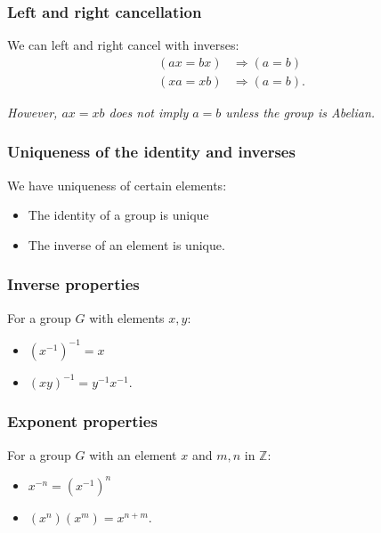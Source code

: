 \documentclass[a4paper, 12pt, twoside]{article}
\begin{document}
\subsubsection{Left and right cancellation}

We can left and right cancel with inverses:
\begin{align*}
      (ax = bx) & \Rightarrow (a = b) \tag{$\forall a, b, x \in G$}  \\
      (xa = xb) & \Rightarrow (a = b). \tag{$\forall a, b, x \in G$}
\end{align*}

\textit{However, $ax = xb$ does not imply $a = b$ unless the group is Abelian.}

\subsubsection{Uniqueness of the identity and inverses}

We have uniqueness of certain elements:

\begin{itemize}
      \item The identity of a group is unique
      \item The inverse of an element is unique.
\end{itemize}

\subsubsection{Inverse properties}

For a group $G$ with elements $x, y$:

\begin{itemize}
      \item $(x^{-1})^{-1} = x$
      \item $(xy)^{-1} = y^{-1}x^{-1}$.
\end{itemize}

\subsubsection{Exponent properties}

For a group $G$ with an element $x$ and $m, n$ in $\mathbb{Z}$:

\begin{itemize}
      \item $x^{-n} = (x^{-1})^n$
      \item $(x^n)(x^m) = x^{n + m}$.
\end{itemize}
\end{document}

